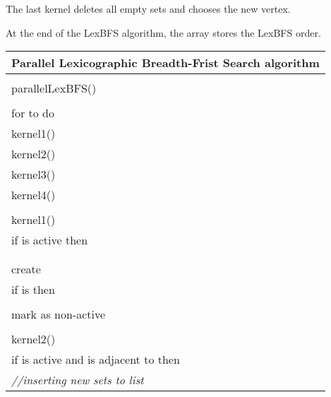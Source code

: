 \documentclass[a4paper, 11pt]{article}
\begin{document}
The last kernel deletes all empty sets and chooses the new  vertex.

At the end of the LexBFS algorithm, the  array stores the LexBFS order.\\

\begin{tabular}{l}
\hline
Parallel Lexicographic Breadth-Frist Search algorithm\\
\hline
\\
parallelLexBFS()\\
\hspace{0.5cm} \\
\hspace{0.5cm} for  to  do\\
\hspace{0.5cm}\hspace{0.5cm} kernel1()\\
\hspace{0.5cm}\hspace{0.5cm} kernel2()\\
\hspace{0.5cm}\hspace{0.5cm} kernel3()\\
\hspace{0.5cm}\hspace{0.5cm} kernel4()\\
\\
kernel1()\\
\hspace{0.5cm} if  is active then\\
\hspace{1cm}        \\
\hspace{1cm}        \\
\hspace{1cm}        create \\
\hspace{0.5cm} if  is  then\\
\hspace{1cm}        \\
\hspace{1cm}        mark  as non-active\\
\\
kernel2()\\
\hspace{0.5cm} if  is active and  is adjacent to  then\\
\hspace{1cm}        \textit{//inserting new sets to list}\\

\end{tabular}
\end{document}
